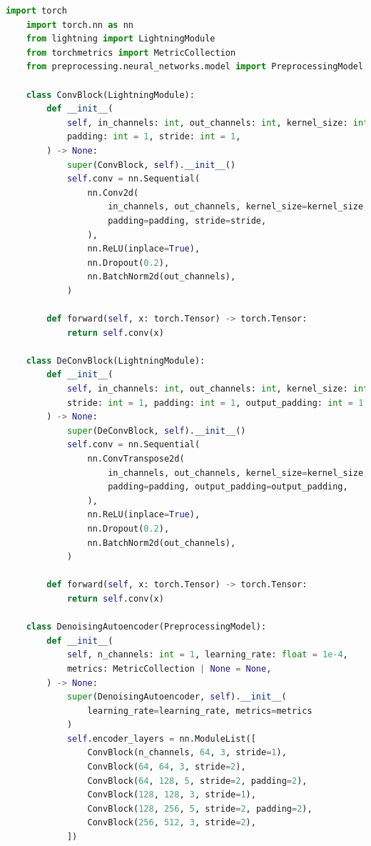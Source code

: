 \documentclass[male,czech,api_ing]{thesis}
\begin{document}
\begin{lstlisting}[language=Python, caption={Implementace autoenkodéru pro redukci šumu}, label={lst:DAEClass}]
    import torch
    import torch.nn as nn
    from lightning import LightningModule
    from torchmetrics import MetricCollection
    from preprocessing.neural_networks.model import PreprocessingModel

    class ConvBlock(LightningModule):
        def __init__(
            self, in_channels: int, out_channels: int, kernel_size: int = 3,
            padding: int = 1, stride: int = 1,
        ) -> None:
            super(ConvBlock, self).__init__()
            self.conv = nn.Sequential(
                nn.Conv2d(
                    in_channels, out_channels, kernel_size=kernel_size,
                    padding=padding, stride=stride,
                ),
                nn.ReLU(inplace=True),
                nn.Dropout(0.2),
                nn.BatchNorm2d(out_channels),
            )

        def forward(self, x: torch.Tensor) -> torch.Tensor:
            return self.conv(x)

    class DeConvBlock(LightningModule):
        def __init__(
            self, in_channels: int, out_channels: int, kernel_size: int = 3,
            stride: int = 1, padding: int = 1, output_padding: int = 1,
        ) -> None:
            super(DeConvBlock, self).__init__()
            self.conv = nn.Sequential(
                nn.ConvTranspose2d(
                    in_channels, out_channels, kernel_size=kernel_size, stride=stride,
                    padding=padding, output_padding=output_padding,
                ),
                nn.ReLU(inplace=True),
                nn.Dropout(0.2),
                nn.BatchNorm2d(out_channels),
            )

        def forward(self, x: torch.Tensor) -> torch.Tensor:
            return self.conv(x)

    class DenoisingAutoencoder(PreprocessingModel):
        def __init__(
            self, n_channels: int = 1, learning_rate: float = 1e-4,
            metrics: MetricCollection | None = None,
        ) -> None:
            super(DenoisingAutoencoder, self).__init__(
                learning_rate=learning_rate, metrics=metrics
            )        
            self.encoder_layers = nn.ModuleList([
                ConvBlock(n_channels, 64, 3, stride=1),
                ConvBlock(64, 64, 3, stride=2),
                ConvBlock(64, 128, 5, stride=2, padding=2),
                ConvBlock(128, 128, 3, stride=1),
                ConvBlock(128, 256, 5, stride=2, padding=2),
                ConvBlock(256, 512, 3, stride=2),
            ])
            

\end{lstlisting}
\end{document}

